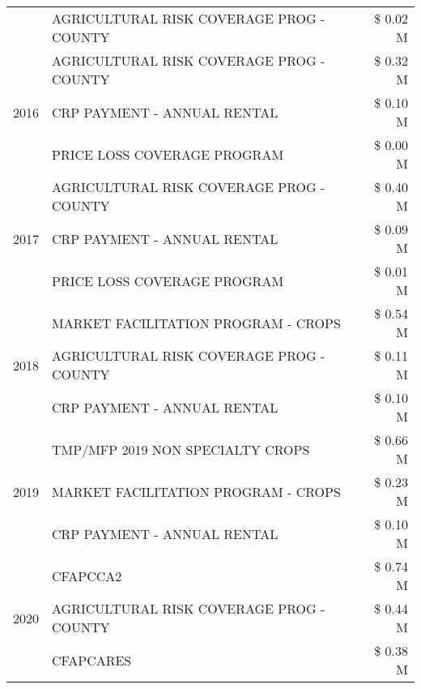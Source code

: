 \begin{tabular}{llr}
 & AGRICULTURAL RISK COVERAGE PROG - COUNTY & \$ 0.02 M \\
\cline{1-3}
\multirow[t]{3}{*}{2016} & AGRICULTURAL RISK COVERAGE PROG - COUNTY      & \$ 0.32 M \\
 & CRP PAYMENT - ANNUAL RENTAL                   & \$ 0.10 M \\
 & PRICE LOSS COVERAGE PROGRAM                   & \$ 0.00 M \\
\cline{1-3}
\multirow[t]{3}{*}{2017} & AGRICULTURAL RISK COVERAGE PROG - COUNTY & \$ 0.40 M \\
 & CRP PAYMENT - ANNUAL RENTAL & \$ 0.09 M \\
 & PRICE LOSS COVERAGE PROGRAM & \$ 0.01 M \\
\cline{1-3}
\multirow[t]{3}{*}{2018} & MARKET FACILITATION PROGRAM - CROPS & \$ 0.54 M \\
 & AGRICULTURAL RISK COVERAGE PROG - COUNTY & \$ 0.11 M \\
 & CRP PAYMENT - ANNUAL RENTAL & \$ 0.10 M \\
\cline{1-3}
\multirow[t]{3}{*}{2019} & TMP/MFP 2019 NON SPECIALTY CROPS & \$ 0.66 M \\
 & MARKET FACILITATION PROGRAM - CROPS & \$ 0.23 M \\
 & CRP PAYMENT - ANNUAL RENTAL & \$ 0.10 M \\
\cline{1-3}
\multirow[t]{3}{*}{2020} & CFAPCCA2 & \$ 0.74 M \\
 & AGRICULTURAL RISK COVERAGE PROG - COUNTY & \$ 0.44 M \\
 & CFAPCARES & \$ 0.38 M \\
\cline{1-3}
\bottomrule
\end{tabular}
